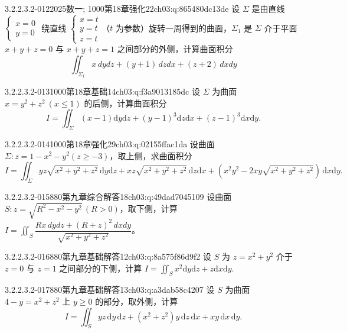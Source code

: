 \begin{q}{3.2.2.3.2-012}{2025数一; 1000第18章强化22}{ch03:q:865480dc13de}
设 $\Sigma$ 是由直线 $\begin{cases} x = 0 \\ y = 0 \end{cases}$ 绕直线 $\begin{cases} x = t \\ y = t \\ z = t \end{cases}$（$t$ 为参数）旋转一周得到的曲面，$\Sigma_1$ 是 $\Sigma$ 介于平面 $x + y + z = 0$ 与 $x + y + z = 1$ 之间部分的外侧，计算曲面积分
\[\iint_{\Sigma_1} x\,dydz + (y + 1)\,dzdx + (z + 2)\,dxdy\]
\end{q}

\begin{q}{3.2.2.3.2-013}{1000第18章基础14}{ch03:q:f3a9013185dc}
设 $\Sigma$ 为曲面 $x = y^2 + z^2\ (x \leqslant 1)$ 的后侧，计算曲面积分
\[
I = \iint_{\Sigma} (x-1)\mathrm{d}y\mathrm{d}z + (y-1)^3\mathrm{d}z\mathrm{d}x + (z-1)^3\mathrm{d}x\mathrm{d}y.
\]
\end{q}

\begin{q}{3.2.2.3.2-014}{1000第18章强化29}{ch03:q:02155ffac1da}
设曲面 $\Sigma:z=1-x^2-y^2(z\geq -3)$，取上侧，求曲面积分
\[ I=\iint_{\Sigma} yz\sqrt{x^2+y^2+z^2}\,\mathrm{d}y\mathrm{d}z + xz\sqrt{x^2+y^2+z^2}\,\mathrm{d}z\mathrm{d}x + (x^2y^2-2xy\sqrt{x^2+y^2+z^2})\,\mathrm{d}x\mathrm{d}y. \]
\end{q}

\begin{q}{3.2.2.3.2-015}{880第九章综合解答18}{ch03:q:49dad7045109}
设曲面 $S:z=\sqrt{R^2-x^2-y^2}\,(R>0)$，取下侧，计算 $\displaystyle I=\iint_S \dfrac{Rx\,dy dz+(R+z)^2\,dx dy}{\sqrt{x^2+y^2+z^2}}$。
\end{q}

\begin{q}{3.2.2.3.2-016}{880第九章基础解答12}{ch03:q:8a575f86d9f2}
设 $S$ 为 $z=x^2+y^2$ 介于 $z=0$ 与 $z=1$ 之间部分的下侧，计算 $\displaystyle I=\iint_S x^2\mathrm{d}y\mathrm{d}z+z\mathrm{d}x\mathrm{d}y$.
\end{q}

\begin{q}{3.2.2.3.2-017}{880第九章基础解答13}{ch03:q:a3dab58c4207}
设 $S$ 为曲面 $4-y=x^2+z^2$ 上 $y\ge 0$ 的部分，取外侧，计算
\[
I=\iint_S yz\,\mathrm{d}y\,\mathrm{d}z+(x^2+z^2)y\,\mathrm{d}z\,\mathrm{d}x+xy\,\mathrm{d}x\,\mathrm{d}y.
\]
\end{q}


